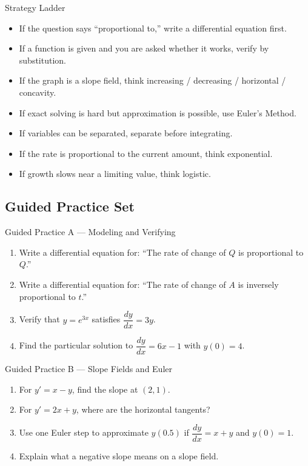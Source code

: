 \documentclass[11pt]{article}
\begin{document}
\begin{summarybox}{Strategy Ladder}
\begin{itemize}
    \item If the question says “proportional to,” write a differential equation first.
    \item If a function is given and you are asked whether it works, verify by substitution.
    \item If the graph is a slope field, think increasing / decreasing / horizontal / concavity.
    \item If exact solving is hard but approximation is possible, use Euler’s Method.
    \item If variables can be separated, separate before integrating.
    \item If the rate is proportional to the current amount, think exponential.
    \item If growth slows near a limiting value, think logistic.
\end{itemize}
\end{summarybox}

\newpage
\subsection{Guided Practice Set}

\begin{practicebox}{Guided Practice A --- Modeling and Verifying}
\begin{enumerate}
    \item Write a differential equation for: “The rate of change of \(Q\) is proportional to \(Q\).”
    \item Write a differential equation for: “The rate of change of \(A\) is inversely proportional to \(t\).”
    \item Verify that \(y=e^{3x}\) satisfies \(\dfrac{dy}{dx}=3y\).
    \item Find the particular solution to \(\dfrac{dy}{dx}=6x-1\) with \(y(0)=4\).
\end{enumerate}
\end{practicebox}

\begin{practicebox}{Guided Practice B --- Slope Fields and Euler}
\begin{enumerate}
    \item For \(y'=x-y\), find the slope at \((2,1)\).
    \item For \(y'=2x+y\), where are the horizontal tangents?
    \item Use one Euler step to approximate \(y(0.5)\) if \(\dfrac{dy}{dx}=x+y\) and \(y(0)=1\).
    \item Explain what a negative slope means on a slope field.
\end{enumerate}
\end{practicebox}
\end{document}

